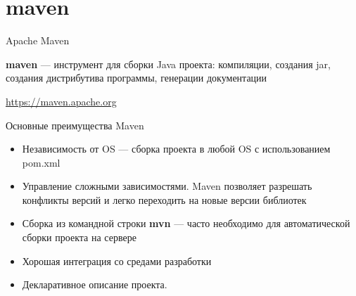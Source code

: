 \section{maven}

\begin{frame}[t]{Apache Maven}

\textbf{maven} --- инструмент для сборки Java проекта: компиляции, создания jar, создания дистрибутива программы, генерации документации

\url{https://maven.apache.org}

\end{frame}

\begin{frame}[t]{Основные преимущества Maven}
  \begin{itemize}
    \item Независимость от OS --- сборка проекта в любой OS с использованием pom.xml
    \item Управление сложными зависимостями. Maven позволяет разрешать конфликты версий и легко переходить на новые версии библиотек
    \item Сборка из командной строки \textbf{mvn} --- часто необходимо для автоматической сборки проекта на сервере
    \item Хорошая интеграция со средами разработки
    \item Декларативное описание проекта. 
  \end{itemize}
\end{frame}

